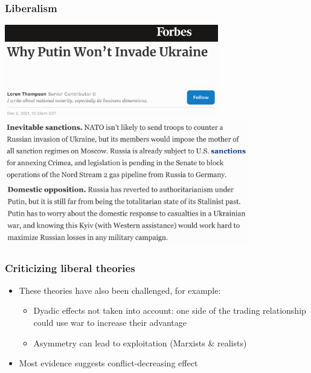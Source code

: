 \documentclass[aspectratio=43]{beamer}
\begin{document}
\begin{frame}
\frametitle{Liberalism}
\centering

\includegraphics[width = 0.7\textwidth]{img/forbes_why_not1}\\
\includegraphics[width = 0.8\textwidth]{img/forbes_why_not2}\\
\includegraphics[width = 0.8\textwidth]{img/forbes_why_not3}

\end{frame}

\begin{frame}
\frametitle{Criticizing liberal theories}
\centering

\begin{itemize}
\item These theories have also been challenged, for example:
  \begin{itemize}
  \item Dyadic effects not taken into account: one side of the trading relationship could use war to increase their advantage
  \item Asymmetry can lead to exploitation (Marxists \& realists)
  \end{itemize}
\item Most evidence suggests conflict-decreasing effect
\end{itemize}

\end{frame}
\end{document}
